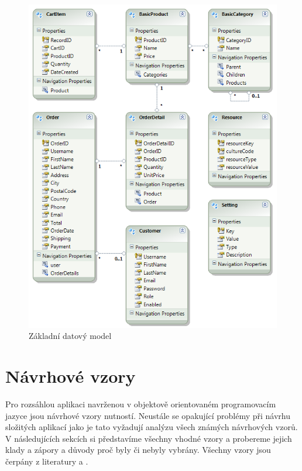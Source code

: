 \documentclass[11pt,twoside,a4paper]{book}
\begin{document}
\begin{figure}[h!]
\begin{center}
\includegraphics[scale=1]{figures/datamodel}
\caption{Základní datový model}
\label{fig:datamodel}
\end{center}
\end{figure}


\section{Návrhové vzory}

Pro rozsáhlou aplikaci navrženou v objektově orientovaném programovacím jazyce jsou návrhové vzory nutností. Neustále se opakující problémy při návrhu složitých aplikací jako je tato vyžadují analýzu všech známých návrhových vzorů. V následujících sekcích si představíme všechny vhodné vzory a probereme jejich klady a zápory a důvody proč byly či nebyly vybrány. Všechny vzory jsou čerpány z literatury \cite{GOF} a \cite{PEAA}.
\end{document}
